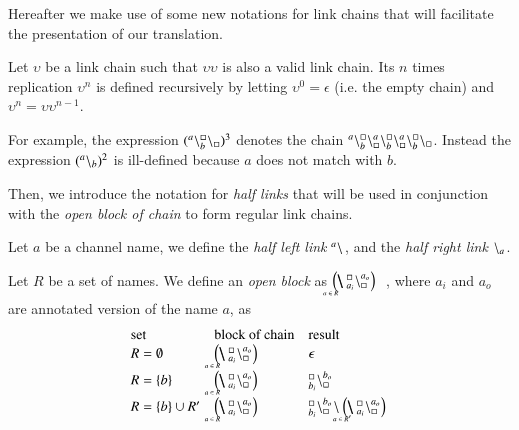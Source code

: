 Hereafter we make use of some new notations for link chains that will facilitate  
the presentation of our translation.

\begin{definition}[Replication]
Let $\upsilon$ be a link chain such that $\upsilon\upsilon$ is also a valid link chain. Its $n$ times replication $\upsilon^n$ is defined recursively by letting
$\upsilon^0 = \epsilon$ (i.e. the empty chain) and $\upsilon^n = \upsilon\upsilon^{n-1}$.
\end{definition}

For example,  the expression $({}^{a}\backslash_{b}^{\scriptstyle {\square}}\backslash_{\scriptstyle {\square}})^3$  denotes the chain ${}^{a}\backslash_{b}^{\scriptstyle {\square}}\backslash_{\scriptstyle {\square}}^{a}\backslash_{b}^{\scriptstyle {\square}}\backslash_{\scriptstyle {\square}}^{a}\backslash_{b}^{\scriptstyle {\square}}\backslash_{\scriptstyle {\square}}$. 
Instead the expression $({}^{a} \backslash_{b})^2$ is ill-defined because $a$ does not match with $b$.

Then, we introduce the notation for \emph{half links} that will be used in conjunction with the \emph{open block of chain} to form regular link chains.

\begin{definition}
Let $a$ be a channel name, we define the \emph{half left link}  ${}^{a} \backslash_{}$,   and the  \emph{half right link} ${}^{} \backslash_{a}$.
\end{definition}

\begin{definition}
Let $R$ be a set of names. We 
define an \emph{open block} as $\blockchain{a_i}{a_o}{a \in R}$\ , where $a_i$ and $a_o$ are annotated version of the name $a$, as
\[
\begin{array}{l@{\quad}l@{\quad}l}
\mbox{set}& \mbox{block of chain}& \mbox{result}\\
R= \emptyset & \blockchain{a_i}{a_o}{a \in R}   &\epsilon\\
R = \{ b\}    &\blockchain{a_i}{a_o}{a \in R}  & {}_{b_i}^{\noact}\chainedlink{\noact}{b_o}\\
R = \{b\} \cup R' & \blockchain{a_i}{a_o}{a \in R} & {}_{b_i}^{\noact}\chainedlink{\noact}{b_o}\link{}{}\blockchain{a_i}{a_o}{a \in R'}
\end{array}
\]
\end{definition}

